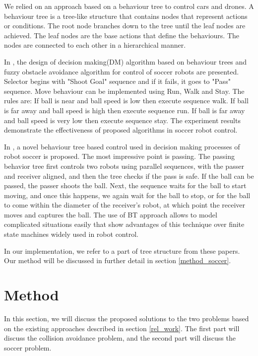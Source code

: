 \documentclass[a4paper,12pt]{article}
\begin{document}
We relied on an approach based on a behaviour tree to control cars and drones. A behaviour tree is a tree-like structure that contains nodes that represent actions or conditions. The root node branches down to the tree until the leaf nodes are achieved. The leaf nodes are the base actions that define the behaviours.
The nodes are connected to each other in a hierarchical manner. 

In \cite{ABIYEV2016477}, the design of decision making(DM) algorithm based on behaviour trees and fuzzy obstacle avoidance algorithm for control of
soccer robots are presented. Selector begins with "Shoot Goal" sequence and if it fails, it goes to "Pass" sequence. Move behaviour can be implemented using Run, Walk and Stay.
The rules are: If ball is near and ball speed is low then execute sequence walk. If ball is far away and ball speed is high then execute sequence run. If ball is far away and ball speed is very low then execute sequence stay.
The experiment results demonstrate the effectiveness of proposed algorithms in soccer robot control.

In \cite{6606326}, a novel behaviour tree based control used in decision making processes of robot soccer is proposed.
The most impressive point is passing.
The passing behavior tree first controls two robots using parallel sequences, with the passer and receiver aligned, 
and then the tree checks if the pass is safe. If the ball can be passed, the passer shoots the ball.
Next, the sequence waits for the ball to start moving, and once this happens, 
we again wait for the ball to stop, or for the ball to come within the diameter of the receiver's robot, 
at which point the receiver moves and captures the ball. The use of BT approach allows to model complicated 
situations easily that show advantages of this technique over finite state machines widely
used in robot control\cite{6606326}.



In our implementation, we refer to a part of tree structure from these papers. Our method will be discussed in further detail in section \ref{method_soccer}.




\section{Method}
\label{method}

In this section, we will discuss the proposed solutions to the two problems based on the existing approaches described in section \ref{rel_work}. The first part will discuss the collision avoidance problem, and the second part will discuss the soccer problem.
\end{document}
